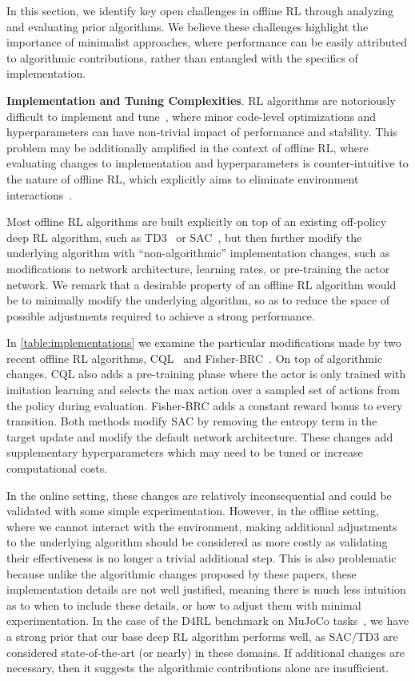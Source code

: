 \documentclass{article}
\begin{document}
In this section, we identify key open challenges in offline RL through analyzing and evaluating prior algorithms. We believe these challenges highlight the importance of minimalist approaches, where performance can be easily attributed to algorithmic contributions, rather than entangled with the specifics of implementation. 

\textbf{Implementation and Tuning Complexities}. RL algorithms are notoriously difficult to implement and tune~\citep{henderson2017deep,Engstrom2020Implementation,furuta2021identifying}, where minor code-level optimizations and hyperparameters can have non-trivial impact of performance and stability. This problem may be additionally amplified in the context of offline RL, where evaluating changes to implementation and hyperparameters is counter-intuitive to the nature of offline RL, which explicitly aims to eliminate environment interactions~\citep{paine2020hyperparameter, yang2020offline}. 

Most offline RL algorithms are built explicitly on top of an existing off-policy deep RL algorithm, such as TD3~\citep{fujimoto2018addressing} or SAC~\citep{haarnoja2018soft}, but then further modify the underlying algorithm with ``non-algorithmic'' implementation changes, such as modifications to network architecture, learning rates, or pre-training the actor network. 
We remark that a desirable property of an offline RL algorithm would be to minimally modify the underlying algorithm, so as to reduce the space of possible adjustments required to achieve a strong performance. 

In \autoref{table:implementations} we examine the particular modifications made by two recent offline RL algorithms, CQL~\citep{kumar2020conservative} and Fisher-BRC~\citep{kostrikov2021offline}. On top of algorithmic changes, 
CQL also adds a pre-training phase where the actor is only trained with imitation learning and selects the max action over a sampled set of actions from the policy during evaluation. Fisher-BRC adds a constant reward bonus to every transition. Both methods modify SAC by removing the entropy term in the target update and modify the default network architecture. These changes add supplementary hyperparameters which may need to be tuned or increase computational costs.

In the online setting, these changes are relatively inconsequential and could be validated with some simple experimentation. However, in the offline setting, where we cannot interact with the environment, making additional adjustments to the underlying algorithm should be considered as more costly as validating their effectiveness is no longer a trivial additional step. This is also problematic because unlike the algorithmic changes proposed by these papers, these implementation details are not well justified, meaning there is much less intuition as to when to include these details, or how to adjust them with minimal experimentation. In the case of the D4RL benchmark on MuJoCo tasks~\citep{mujoco, fu2021benchmarks}, we have a strong prior that our base deep RL algorithm performs well, as SAC/TD3 are considered state-of-the-art (or nearly) in these domains. If additional changes are necessary, then it suggests the algorithmic contributions alone are insufficient. 
\end{document}
